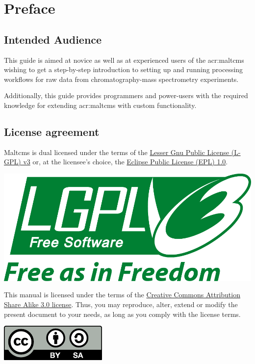 \chapter*{Preface}
\section*{Intended Audience}
This guide is aimed at novice as well as at experienced users of the \gls{acr:maltcms} wishing to get a step-by-step introduction
to setting up and running processing workflows for raw data from chromatography-mass spectrometry experiments. 

Additionally, this guide provides programmers and power-users with the required knowledge for extending \gls{acr:maltcms} with custom functionality. 
\section*{License agreement}
Maltcms is dual licensed under the terms of the \href{http://www.gnu.org/licenses/lgpl.html}{Lesser Gnu Public License (L-GPL) v3} or, 
at the licensee's choice, the \href{http://www.eclipse.org/legal/epl-v10.html}{Eclipse Public License (EPL) 1.0}.

\begin{flushleft}
\includegraphics[scale=0.2]{../resources/images/lgpl-v3.pdf} 
\end{flushleft}

\noindent This manual is licensed under the terms of the \href{http://creativecommons.org/licenses/by-sa/3.0/deed.en}{Creative Commons Attribution Share Alike 3.0 license}. Thus, you may reproduce, alter, extend or modify the present document to your needs, as long as you comply with the license terms. 
\begin{flushleft}
\includegraphics[scale=1]{../resources/images/by-sa.pdf} 
\end{flushleft}

